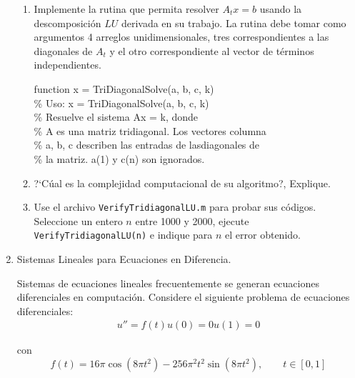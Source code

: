 \documentclass[12pt]{article}
\begin{document}
\begin{enumerate}
\begin{enumerate}
\item Implemente la rutina que permita resolver $A_tx=b$ usando la descomposici\'on $LU$ derivada 
en su trabajo. La rutina debe tomar como argumentos 4 arreglos unidimensionales, tres 
correspondientes a las diagonales de $A_t$ y el otro correspondiente al vector de t\'erminos 
independientes.
\begin{tt}
   function x = TriDiagonalSolve(a, b, c, k)\\
\% Uso: x = TriDiagonalSolve(a, b, c, k)\\
\% Resuelve el sistema Ax = k, donde\\
\% A es una matriz tridiagonal. Los vectores columna\\
\% a, b, c describen las entradas  de lasdiagonales de\\ 
\% la matriz. a(1) y c(n) son ignorados.
\end{tt}

\item ?`C\'ual es la complejidad computacional de su algoritmo?, Explique.

\item Use el archivo {\tt VerifyTridiagonalLU.m} para probar sus c\'odigos. Seleccione un entero 
$n$ entre 1000 y 2000, ejecute {\tt VerifyTridiagonalLU(n)}  e indique para $n$ el error obtenido.
\end{enumerate}

\item Sistemas Lineales para Ecuaciones en Diferencia. 

Sistemas de ecuaciones lineales frecuentemente se generan ecuaciones diferenciales en 
computaci\'on. Considere el siguiente problema de ecuaciones diferenciales:
\begin{eqnarray}
   u'' = f(t)
   u(0) = 0
   u(1) = 0
\end{eqnarray}

con 
$$
f(t) = 16\pi\cos(8\pi t^2)-256\pi^2t^2\sin(8\pi t^2), \qquad t \in [0,1]
$$


\end{enumerate}
\end{document}
